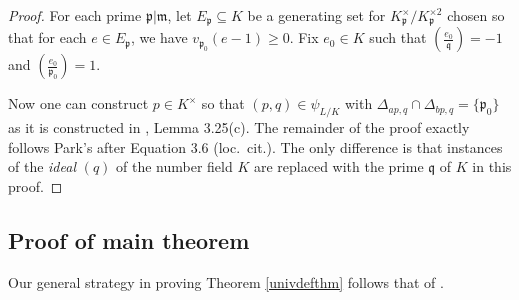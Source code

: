 \documentclass[12pt,reqno]{amsart}
\newcommand{\qq}{\mathfrak{q}}
\newcommand{\mm}{\mathfrak{m}}
\newcommand{\pp}{\mathfrak{p}}
\newcommand{\LL}{\mathfrak{l}}
\theoremstyle{definition}
\begin{document}
\begin{proof}
For each prime $\pp|\mm$, let $E_{\pp}\subseteq K$ be a generating set for $K_{\pp}^{\times}/K_{\pp}^{\times2}$ chosen so that for each $e\in E_{\pp}$, we have $v_{\pp_0}(e-1)\geq 0$. Fix $e_0\in K$ such that $\left(\frac{e_0}{\qq}\right)=-1$ and $\left(\frac{e_0}{\pp_0}\right)=1$. 


Now one can construct $p\in K^{\times}$ so that $(p,q)\in \psi_{L/K}$ with $\Delta_{ap,q}\cap\Delta_{bp,q}=\{\pp_0\}$ as it is constructed in \cite{Park}, Lemma 3.25(c). The remainder of the proof exactly follows Park's after Equation 3.6 (loc.\ cit.). The only difference is that instances of the \emph{ideal} $(q)$ of the number field $K$ are replaced with the prime $\qq$ of $K$ in this proof. 







\end{proof}




\subsection{Proof of main theorem}\label{univdefthmpf}
Our general strategy in proving Theorem \ref{univdefthm} follows that of \cite{Koe13}. 
\end{document}

